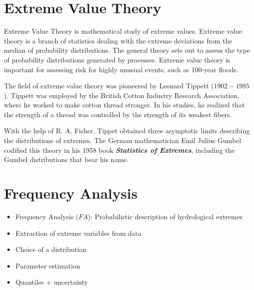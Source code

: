 
\section{Extreme Value Theory}
Extreme Value Theory is mathematical study of extreme values.
Extreme value theory is a branch of statistics dealing with the extreme deviations from the median of probability distributions. The general theory sets out to assess the type of probability distributions generated by processes. Extreme value theory is important for assessing risk for highly unusual events, such as 100-year floods.

The field of extreme value theory was pioneered by Leonard Tippett ($1902-1985$). Tippett was employed by the British Cotton Industry Research Association, where he worked to make cotton thread stronger. In his studies, he realized that the strength of a thread was controlled by the strength of its weakest fibers.

With the help of R. A. Fisher, Tippet obtained three asymptotic limits describing the distributions of extremes. The German mathematician Emil Julius Gumbel codified this theory in his 1958 book \textbf{\emph{Statistics of Extremes}}, including the Gumbel distributions that bear his name.
\section{Frequency Analysis}
\begin{itemize}
	\item Frequency Analysis ($FA$): Probabilistic description of hydrological extremes
	\item Extraction of extreme variables from data
	\item Choice of a distribution
	\item Parameter estimation
	\item Quantiles + uncertainty
\end{itemize}



